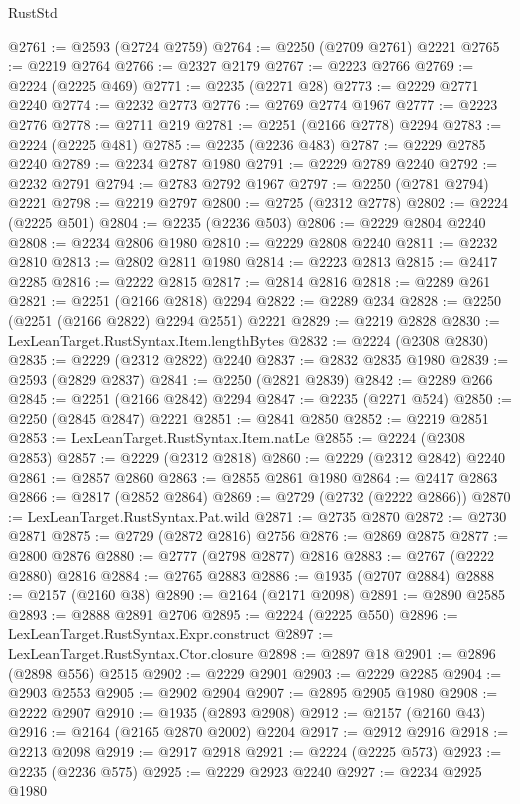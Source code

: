 \begin{lexlean}{RustStd}
\begin{coremodule}
{\begin{coremodule}
{{{{{{{{{{{{{{{{{{{{{{{{{{{{{{{{{{{{{{{{{{{{{{{{{{{{{@2761 := @2593 (@2724 @2759)
@2764 := @2250 (@2709 @2761) @2221
@2765 := @2219 @2764
@2766 := @2327 @2179
@2767 := @2223 @2766
@2769 := @2224 (@2225 @469)
@2771 := @2235 (@2271 @28)
@2773 := @2229 @2771 @2240
@2774 := @2232 @2773
@2776 := @2769 @2774 @1967
@2777 := @2223 @2776
@2778 := @2711 @219
@2781 := @2251 (@2166 @2778) @2294
@2783 := @2224 (@2225 @481)
@2785 := @2235 (@2236 @483)
@2787 := @2229 @2785 @2240
@2789 := @2234 @2787 @1980
@2791 := @2229 @2789 @2240
@2792 := @2232 @2791
@2794 := @2783 @2792 @1967
@2797 := @2250 (@2781 @2794) @2221
@2798 := @2219 @2797
@2800 := @2725 (@2312 @2778)
@2802 := @2224 (@2225 @501)
@2804 := @2235 (@2236 @503)
@2806 := @2229 @2804 @2240
@2808 := @2234 @2806 @1980
@2810 := @2229 @2808 @2240
@2811 := @2232 @2810
@2813 := @2802 @2811 @1980
@2814 := @2223 @2813
@2815 := @2417 @2285
@2816 := @2222 @2815
@2817 := @2814 @2816
@2818 := @2289 @261
@2821 := @2251 (@2166 @2818) @2294
@2822 := @2289 @234
@2828 := @2250 (@2251 (@2166 @2822) @2294 @2551) @2221
@2829 := @2219 @2828
@2830 := LexLeanTarget.RustSyntax.Item.lengthBytes
@2832 := @2224 (@2308 @2830)
@2835 := @2229 (@2312 @2822) @2240
@2837 := @2832 @2835 @1980
@2839 := @2593 (@2829 @2837)
@2841 := @2250 (@2821 @2839)
@2842 := @2289 @266
@2845 := @2251 (@2166 @2842) @2294
@2847 := @2235 (@2271 @524)
@2850 := @2250 (@2845 @2847) @2221
@2851 := @2841 @2850
@2852 := @2219 @2851
@2853 := LexLeanTarget.RustSyntax.Item.natLe
@2855 := @2224 (@2308 @2853)
@2857 := @2229 (@2312 @2818)
@2860 := @2229 (@2312 @2842) @2240
@2861 := @2857 @2860
@2863 := @2855 @2861 @1980
@2864 := @2417 @2863
@2866 := @2817 (@2852 @2864)
@2869 := @2729 (@2732 (@2222 @2866))
@2870 := LexLeanTarget.RustSyntax.Pat.wild
@2871 := @2735 @2870
@2872 := @2730 @2871
@2875 := @2729 (@2872 @2816) @2756
@2876 := @2869 @2875
@2877 := @2800 @2876
@2880 := @2777 (@2798 @2877) @2816
@2883 := @2767 (@2222 @2880) @2816
@2884 := @2765 @2883
@2886 := @1935 (@2707 @2884)
@2888 := @2157 (@2160 @38)
@2890 := @2164 (@2171 @2098)
@2891 := @2890 @2585
@2893 := @2888 @2891 @2706
@2895 := @2224 (@2225 @550)
@2896 := LexLeanTarget.RustSyntax.Expr.construct
@2897 := LexLeanTarget.RustSyntax.Ctor.closure
@2898 := @2897 @18
@2901 := @2896 (@2898 @556) @2515
@2902 := @2229 @2901
@2903 := @2229 @2285
@2904 := @2903 @2553
@2905 := @2902 @2904
@2907 := @2895 @2905 @1980
@2908 := @2222 @2907
@2910 := @1935 (@2893 @2908)
@2912 := @2157 (@2160 @43)
@2916 := @2164 (@2165 @2870 @2002) @2204
@2917 := @2912 @2916
@2918 := @2213 @2098
@2919 := @2917 @2918
@2921 := @2224 (@2225 @573)
@2923 := @2235 (@2236 @575)
@2925 := @2229 @2923 @2240
@2927 := @2234 @2925 @1980
}}}}}}}}}}}}}}}}}}}}}}}}}}}}}}}}}}}}}}}}}}}}}}}}}}}}}
\end{coremodule}}
\end{coremodule}
\end{lexlean}
